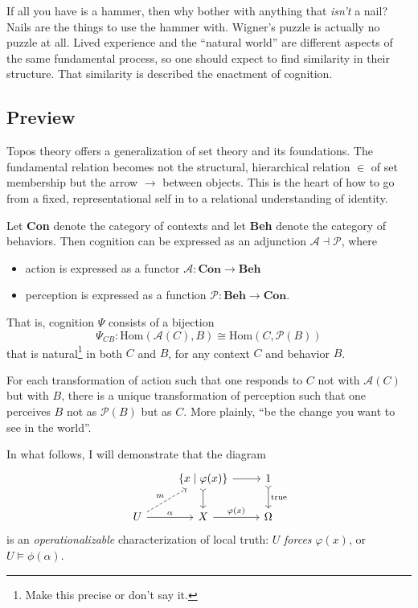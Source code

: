 \documentclass{article}
\begin{document}
If all you have is a hammer, then why bother with anything that \emph{isn't} a nail? Nails are the things to use the hammer with. Wigner's puzzle is actually no puzzle at all. Lived experience and the ``natural world'' are different aspects of the same fundamental process, so one should expect to find similarity in their structure. That similarity is described the enactment of cognition.

\subsection{Preview}

Topos theory offers a generalization of set theory and its foundations. The fundamental relation becomes not the structural, hierarchical relation $\in$ of set membership but the arrow $\to$ between objects. This is the heart of how to go from a fixed, representational self in to a relational understanding of identity.

Let \textbf{Con} denote the category of contexts and let \textbf{Beh} denote the category of behaviors. Then cognition can be expressed as an adjunction $\mathcal{A} \dashv \mathcal{P}$, where

\begin{itemize}
    \item action is expressed as a functor $\mathcal{A} \colon \textbf{Con} \to \textbf{Beh}$
    \item perception is expressed as a function $\mathcal{P} \colon \textbf{Beh} \to \textbf{Con}$.
\end{itemize}

That is, cognition $\Psi$ consists of a bijection
\[
    \Psi_{CB} \colon \text{Hom} ( \mathcal{A}(C), B ) \cong \text{Hom}(C, \mathcal{P}(B))
\]
that is natural\footnote{Make this precise or don't say it.} in both $C$ and $B$, for any context $C$ and behavior $B$.

For each transformation of action such that one responds to $C$ not with $\mathcal{A}(C)$ but with $B$, there is a unique transformation of perception such that one perceives $B$ not as $\mathcal{P}(B)$ but as $C$. More plainly, ``be the change you want to see in the world''.

In what follows, I will demonstrate that the diagram
\[
    \begin{tikzcd}
        & \{ x \mid \varphi(x) \}  \arrow[r] \arrow[d, tail] & 1 \arrow[d, tail, "\text{true}"] \\
        U \arrow[r, "\alpha"] \arrow[ru, dashed, "m"] & X \arrow[r, "\varphi(x)"] & \Omega
    \end{tikzcd}
\]
is an \emph{operationalizable} characterization of local truth: $U$ \emph{forces} $\varphi(x)$, or $U \vDash \phi(\alpha)$.
\end{document}

